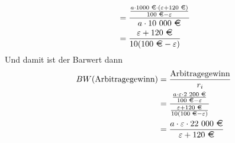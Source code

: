 \documentclass{article}
\renewcommand{\epsilon}{\varepsilon}
\begin{document}
\begin{enumerate}[label=(\alph*)]
\begin{align}
			&= \frac{\frac{a\cdot 1000\text{ \EUR}\cdot (\epsilon + 120\text{ \EUR})}{100\text{ \EUR}-\epsilon}}{a\cdot\text{10 000 \EUR}} \notag \\
			&= \frac{\epsilon + 120\text{ \EUR}}{10(100\text{ \EUR} - \epsilon)} \notag
		\end{align}
		Und damit ist der Barwert dann
		\begin{align}
			BW(\text{Arbitragegewinn}) &= \frac{\text{Arbitragegewinn}}{r_i} \notag \\
			&= \frac{\frac{a\cdot\epsilon\cdot\text{2 200 \EUR}}{100\text{ \EUR} - \epsilon}}{\frac{\epsilon + 120\text{ \EUR}}{10(100\text{ \EUR} - \epsilon)}} \notag \\
			&= \frac{a\cdot\epsilon\cdot\text{22 000 \EUR}}{\epsilon + 120\text{ \EUR}} \notag
		\end{align}
	\end{enumerate}
	
\end{document}
